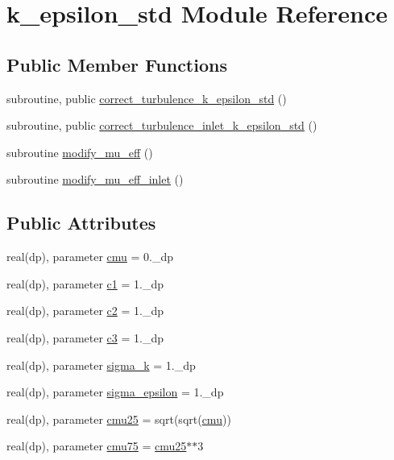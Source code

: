 \hypertarget{classk__epsilon__std}{\section{k\-\_\-epsilon\-\_\-std Module Reference}
\label{classk__epsilon__std}
}
\subsection*{Public Member Functions}
\begin{DoxyCompactItemize}
\item 
subroutine, public \hyperlink{classk__epsilon__std_aba071419bae84ce7a551ad2786481333}{correct\-\_\-turbulence\-\_\-k\-\_\-epsilon\-\_\-std} ()
\item 
subroutine, public \hyperlink{classk__epsilon__std_a1f9fe4f360a65f9d3f13c90cc30870b0}{correct\-\_\-turbulence\-\_\-inlet\-\_\-k\-\_\-epsilon\-\_\-std} ()
\item 
subroutine \hyperlink{classk__epsilon__std_a0a532283b523bd70158bf79b67d8d70e}{modify\-\_\-mu\-\_\-eff} ()
\item 
subroutine \hyperlink{classk__epsilon__std_a67a34b9f9d0599206952688d26e0d903}{modify\-\_\-mu\-\_\-eff\-\_\-inlet} ()
\end{DoxyCompactItemize}
\subsection*{Public Attributes}
\begin{DoxyCompactItemize}
\item 
real(dp), parameter \hyperlink{classk__epsilon__std_ab8b45782adecbcc30ebf7b73d34a5ebd}{cmu} = 0.\-\_\-dp
\item 
real(dp), parameter \hyperlink{classk__epsilon__std_a93ff6c4e5f083bc36a60209c171035f8}{c1} = 1.\-\_\-dp
\item 
real(dp), parameter \hyperlink{classk__epsilon__std_a42ad7b9456f3e4d745d15cbfa7dd05c9}{c2} = 1.\-\_\-dp
\item 
real(dp), parameter \hyperlink{classk__epsilon__std_a95e68b7b052df6838c3c516dd66cf0c5}{c3} = 1.\-\_\-dp
\item 
real(dp), parameter \hyperlink{classk__epsilon__std_a6fa05e7c5d25ef3f137a8fbf3523f86e}{sigma\-\_\-k} = 1.\-\_\-dp
\item 
real(dp), parameter \hyperlink{classk__epsilon__std_a915f88270b38c6960c564a1e62b30a4b}{sigma\-\_\-epsilon} = 1.\-\_\-dp
\item 
real(dp), parameter \hyperlink{classk__epsilon__std_a5560ee6203c001281958b7335769e6e4}{cmu25} = sqrt(sqrt(\hyperlink{classk__epsilon__std_ab8b45782adecbcc30ebf7b73d34a5ebd}{cmu}))
\item 
real(dp), parameter \hyperlink{classk__epsilon__std_a385af61636cbfd6cd867898d54c297f1}{cmu75} = \hyperlink{classk__epsilon__std_a5560ee6203c001281958b7335769e6e4}{cmu25}$\ast$$\ast$3
\end{DoxyCompactItemize}
